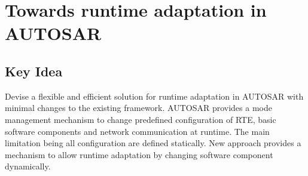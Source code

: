 \section{Towards runtime adaptation in AUTOSAR}

\subsection{Key Idea}
Devise a flexible and efficient solution for runtime adaptation in AUTOSAR with minimal changes to the existing framework.
AUTOSAR provides a mode management mechanism to change predefined configuration of RTE, basic software components and network communication at runtime.
The main limitation being all configuration are defined statically.
New approach provides a mechanism to allow runtime adaptation by changing software component dynamically.

